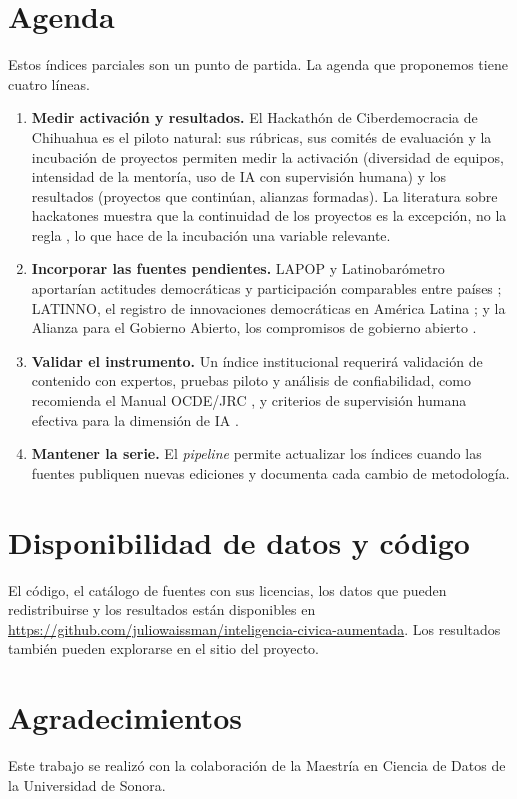 \documentclass[11pt,a4paper]{article}
\begin{document}
\section{Agenda}

Estos índices parciales son un punto de partida. La agenda que proponemos tiene cuatro líneas.
\begin{enumerate}
  \item \textbf{Medir activación y resultados.} El Hackathón de Ciberdemocracia de Chihuahua \parencite{zenteno_ica_2026} es el piloto natural: sus rúbricas, sus comités de evaluación y la incubación de proyectos permiten medir la activación (diversidad de equipos, intensidad de la mentoría, uso de IA con supervisión humana) y los resultados (proyectos que continúan, alianzas formadas). La literatura sobre hackatones muestra que la continuidad de los proyectos es la excepción, no la regla \parencite{nolte_2020}, lo que hace de la incubación una variable relevante.
  \item \textbf{Incorporar las fuentes pendientes.} LAPOP y Latinobarómetro aportarían actitudes democráticas y participación comparables entre países \parencite{lapop_americasbarometer,latinobarometro2026}; LATINNO, el registro de innovaciones democráticas en América Latina \parencite{pogrebinschi_latinno2021}; y la Alianza para el Gobierno Abierto, los compromisos de gobierno abierto \parencite{ogp_datos}.
  \item \textbf{Validar el instrumento.} Un índice institucional requerirá validación de contenido con expertos, pruebas piloto y análisis de confiabilidad, como recomienda el Manual OCDE/JRC \parencite{ocde_jrc_2008}, y criterios de supervisión humana efectiva para la dimensión de IA \parencite{sterz_2024,unesco_etica_ia_2021}.
  \item \textbf{Mantener la serie.} El \emph{pipeline} permite actualizar los índices cuando las fuentes publiquen nuevas ediciones y documenta cada cambio de metodología.
\end{enumerate}

\section*{Disponibilidad de datos y código}
El código, el catálogo de fuentes con sus licencias, los datos que pueden redistribuirse y los resultados están disponibles en \url{https://github.com/juliowaissman/inteligencia-civica-aumentada}. Los resultados también pueden explorarse en el sitio del proyecto.

\section*{Agradecimientos}
Este trabajo se realizó con la colaboración de la Maestría en Ciencia de Datos de la Universidad de Sonora.

\printbibliography[title={Referencias}]
\end{document}
